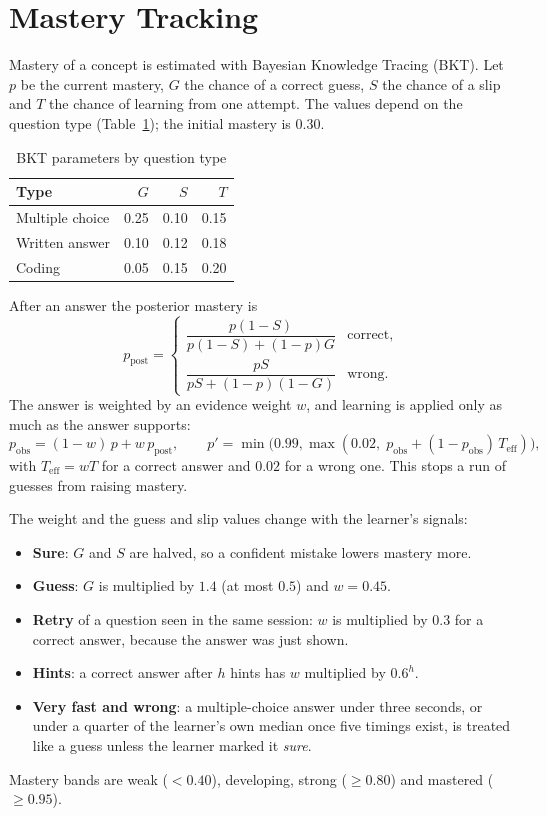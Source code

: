 \section{Mastery Tracking}
\label{sec:bkt}
Mastery of a concept is estimated with Bayesian Knowledge Tracing (BKT). Let $p$ be the current mastery, $G$ the chance of a correct guess, $S$ the chance of a slip and $T$ the chance of learning from one attempt. The values depend on the question type (Table~\ref{tab:bkt}); the initial mastery is $0.30$.

\begin{table}[H]
\centering
\begin{tabular}{lrrr}
\toprule
Type & $G$ & $S$ & $T$ \\
\midrule
Multiple choice & 0.25 & 0.10 & 0.15 \\
Written answer & 0.10 & 0.12 & 0.18 \\
Coding & 0.05 & 0.15 & 0.20 \\
\bottomrule
\end{tabular}
\caption{BKT parameters by question type}
\label{tab:bkt}
\end{table}

After an answer the posterior mastery is
\[
p_{\mathrm{post}} =
\begin{cases}
\dfrac{p(1-S)}{p(1-S)+(1-p)G} & \text{correct},\\[2ex]
\dfrac{pS}{pS+(1-p)(1-G)} & \text{wrong.}
\end{cases}
\]
The answer is weighted by an evidence weight $w$, and learning is applied only as much as the answer supports:
\[
p_{\mathrm{obs}} = (1-w)\,p + w\,p_{\mathrm{post}},\qquad
p' = \min\bigl(0.99,\max(0.02,\;p_{\mathrm{obs}} + (1-p_{\mathrm{obs}})\,T_{\mathrm{eff}})\bigr),
\]
with $T_{\mathrm{eff}} = wT$ for a correct answer and $0.02$ for a wrong one. This stops a run of guesses from raising mastery.

The weight and the guess and slip values change with the learner's signals:
\begin{itemize}
\item \textbf{Sure}: $G$ and $S$ are halved, so a confident mistake lowers mastery more.
\item \textbf{Guess}: $G$ is multiplied by $1.4$ (at most $0.5$) and $w=0.45$.
\item \textbf{Retry} of a question seen in the same session: $w$ is multiplied by $0.3$ for a correct answer, because the answer was just shown.
\item \textbf{Hints}: a correct answer after $h$ hints has $w$ multiplied by $0.6^{h}$.
\item \textbf{Very fast and wrong}: a multiple-choice answer under three seconds, or under a quarter of the learner's own median once five timings exist, is treated like a guess unless the learner marked it \emph{sure}.
\end{itemize}
Mastery bands are weak ($<0.40$), developing, strong ($\ge 0.80$) and mastered ($\ge 0.95$).

